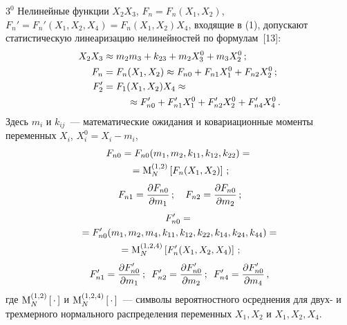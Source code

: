 \begin{multicols}{2}
\begin{description}
\item $3^0$ Нелинейные функции $X_2 X_3$, $F_n = F_n (X_1, X_2)$, $ F_n'=
F_n' ( X_1, X_2, X_4)= F_n (X_1, X_2) X_4$, входящие в (1),
допускают статистическую линеаризацию нелинейностей по формулам~[13]:
 \begin{align*}
X_2 X_3 &\approx m_2 m_3 + k_{23}+ m_2 X_3^0 + m_3 X_2^0\,;\\ %
 F_n &= F_n (X_1,X_2)\approx F_{n0}+F_{n1} X_1^0+ F_{n2} X_2^0\,;\\ %
  F_2' &= F_1 (X_1, X_2) X_4 \approx \\
&\hspace*{25pt} \approx F_{n0}' +F_{n1}' X_1^0+ F_{n2}' X_2^0 + F_{n4}' X_4^0\,. %
\end{align*}
Здесь $m_i$ и $k_{ij}$~--- математические ожидания и ковариационные
моменты переменных $X_i$, $ X_i^0=X_i - m_i$,
 \begin{multline*}
 F_{n0} = F_{n0} (m_1, m_2, k_{11}, k_{12}, k_{22}) ={} \\
{} ={\rm M}_N^{(1,2)} \left[ F_n (X_1, X_2)\right]\,;
 \end{multline*}
$$
 F_{n1} =\fr{\partial F_{n0}}{\partial m_1}\,; \enskip\enskip
 F_{n2} =\fr{\partial F_{n0}}{\partial m_2}\,; %
 $$
 \begin{multline*}
  F_{n0}' ={} \\
{} =F_{n0}' (m_1, m_2, m_4, k_{11}, k_{12}, k_{22}, k_{14}, k_{24}, k_{44})={}\\
{}= {\rm M}_N^{(1,2,4)} \left[ F_n' (X_1, X_2, X_4)\right]\,;
 \end{multline*}
 \begin{equation*}
 F_{n1}' =\fr{\partial F_{n0}'}{\partial m_1}\,;\enskip
 F_{n2}' =\fr{\partial F_{n0}'}{\partial m_2}\,;\enskip
 F_{n4}' =\fr{\partial F_{n0}'}{\partial m_4}\,, %
 \end{equation*}
где ${\rm M}_N^{(1,2)} \left[\, \cdot\, \right]$ и ${\rm M}_N^{(1,2,4)} \left[\, 
\cdot\, \right]$~--- символы вероятностного осреднения для двух- и трехмерного 
нормального распределения переменных $X_1, X_2$ и $X_1,X_2, X_4$.
\end{description}


\end{multicols}
